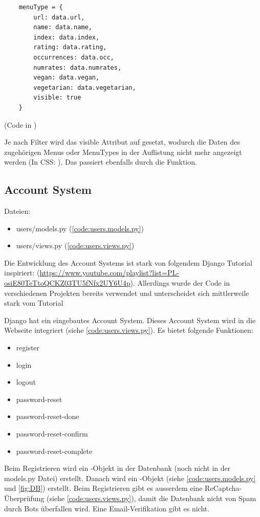 \begin{lstlisting}
    menuType = {
        url: data.url,
        name: data.name,
        index: data.index,
        rating: data.rating,
        occurrences: data.occ,
        numrates: data.numrates,
        vegan: data.vegan,
        vegetarian: data.vegetarian,
        visible: true
    }
\end{lstlisting}

(Code in )

Je nach Filter wird das visible Attribut auf  gesetzt, wodurch die
Daten des zugehörigen Menus oder MenuTypes in der Auflistung nicht mehr
angezeigt werden (In CSS: ). Das passiert ebenfalls durch
die  Funktion.

\newpage

\subsection{Account System} \label{spez:Account}

Dateien:
\begin{itemize}
    \item users/models.py (\ref{code:users.models.py})
    \item users/views.py (\ref{code:users.views.py})
\end{itemize}

Die Entwicklung des Account Systems ist stark von folgendem Django Tutorial
inspiriert:
(\url{https://www.youtube.com/playlist?list=PL-osiE80TeTtoQCKZ03TU5fNfx2UY6U4p}).
Allerdings wurde der Code in verschiedenen Projekten bereits verwendet und
unterscheidet sich mittlerweile stark vom Tutorial

Django hat ein eingebautes Account System. Dieses Account System wird in die
Webseite integriert (siehe \ref{code:users.views.py}). Es bietet folgende
Funktionen:
\begin{itemize}
    \item register
    \item login
    \item logout
    \item password-reset
    \item password-reset-done
    \item password-reset-confirm
    \item password-reset-complete
\end{itemize}

Beim Registrieren wird ein -Objekt in der Datenbank (noch nicht in
der models.py Datei) erstellt. Danach wird ein -Objekt (siehe
\ref{code:users.models.py} und \ref{fig:DB}) erstellt. Beim Registrieren gibt es
ausserdem eine ReCaptcha-Überprüfung (siehe \ref{code:users.views.py}), damit
die Datenbank nicht von Spam durch Bots überfallen wird. Eine Email-Verifikation
gibt es nicht.

